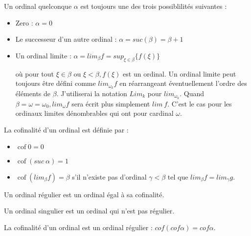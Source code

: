\documentclass[12pt]{beamer}
\begin{document}
\begin{frame}

Un ordinal quelconque \( \alpha \) est toujours une des trois possiblilités suivantes :

\begin{itemize}
     \setlength{\itemsep}{1pt}
     \setlength{\parskip}{0pt}
     \setlength{\parsep}{0pt}

\item Zero : \( \alpha = 0 \)

\item Le successeur d'un autre ordinal : \( \alpha = suc(\beta) = \beta+1 \) 

\item Un ordinal limite : \( \alpha = lim_\beta f = sup_{\xi \in \beta} \lbrace f(\xi) \rbrace \)

où pour tout \( \xi \in \beta \) ou \( \xi < \beta, f(\xi) \) est un ordinal. Un ordinal limite peut toujours être défini comme  \( lim_{\omega_k} f \) en réarrangeant éventuellement l'ordre des éléments de \( \beta \). J'utiliserai la notation \( Lim_k \) pour \( lim_{\omega_k} \). Quand \( \beta = \omega = \omega_0, lim_\omega f \) sera écrit plus simplement \( lim\ f \). C'est le cas pour les ordinaux limites dénombrables qui ont pour cardinal \( \omega \).

\end{itemize}


\end{frame}
\begin{frame}

La cofinalité d'un ordinal est définie par :

\begin{itemize}
     \setlength{\itemsep}{1pt}
     \setlength{\parskip}{0pt}
     \setlength{\parsep}{0pt}

\item \( \operatorname{cof} 0 = 0 \)

\item \( \operatorname{cof} (suc\ \alpha) = 1 \)

\item \( \operatorname{cof} (lim_\beta f) = \beta \) s'il n'existe pas d'ordinal  \( \gamma < \beta \) tel que \( lim_\beta f = lim_\gamma g \).

\end{itemize}

Un ordinal régulier est un ordinal égal à sa cofinalité.

Un ordinal singulier est un ordinal qui n'est pas régulier.

La cofinalité d'un ordinal est un ordinal régulier : \( cof(cof \alpha) = cof \alpha \).

\end{frame}
\end{document}
